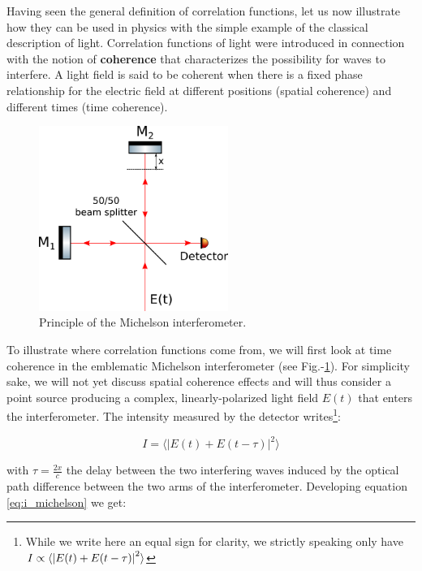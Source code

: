 Having seen the general definition of correlation functions, let us now illustrate how they can be used in physics with the simple example of the classical description of light. Correlation functions of light were introduced in connection with the notion of \textbf{coherence} that characterizes the possibility for waves to interfere. A light field is said to be coherent when there is a fixed phase relationship for the electric field at different positions (spatial coherence) and different times (time coherence). 


\begin{figure}
    \centering
    \includegraphics[width=0.55\textwidth]{Fig/Chapter1/michelson.png}
    \caption{Principle of the Michelson interferometer.}
    \label{fig:michelson}
\end{figure}


To illustrate where correlation functions come from, we will first look at time coherence in the emblematic Michelson interferometer (see Fig.-\ref{fig:michelson}). For simplicity sake, we will not yet discuss spatial coherence effects and will thus consider a point source producing a complex, linearly-polarized light field $E(t)$ that enters the interferometer. The intensity measured by the detector writes\footnote{While we write here an equal sign for clarity, we strictly speaking only have $I \propto \langle\left\lvert E(t)+E(t-\tau)\right\rvert^2\rangle$}:

\begin{equation}
    I= \langle \lvert E(t)+E(t-\tau)\lvert^2 \rangle
    \label{eq:i_michelson}
\end{equation}

\noindent with $\tau=\frac{2x}{c}$ the delay between the two interfering waves induced by the optical path difference between the two arms of the interferometer. Developing equation \ref{eq:i_michelson} we get:

